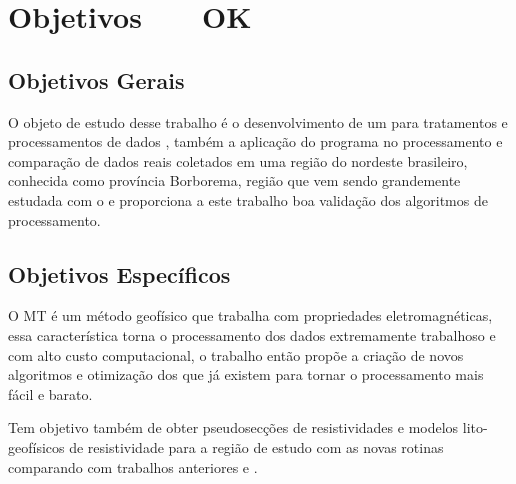 
\chapter{Objetivos \, \,\,\,\,\, OK}
\label{cap-objetivos}

\section{Objetivos Gerais}
\label{cap-objetivos gerais}

    
    O objeto de estudo desse trabalho é o desenvolvimento de um  para tratamentos e processamentos de dados \MT, também a aplicação do programa no processamento e comparação de dados reais coletados em uma região do nordeste brasileiro, conhecida como província Borborema, região que vem sendo grandemente estudada com o \MT e proporciona a este trabalho boa validação dos algoritmos de processamento.

\section{Objetivos Específicos}
\label{cap-objetivos especificos}

    O MT é um método geofísico que trabalha com propriedades eletromagnéticas, essa característica torna o processamento dos dados extremamente trabalhoso e com alto custo computacional, o trabalho então propõe a criação de novos algoritmos e otimização dos que já existem para tornar o processamento mais fácil e barato.
    
    Tem objetivo também de obter pseudosecções de resistividades e modelos lito-geofísicos de resistividade para a região de estudo com as novas rotinas comparando com trabalhos anteriores \cite{tese_andrea} e \cite{alane}.
